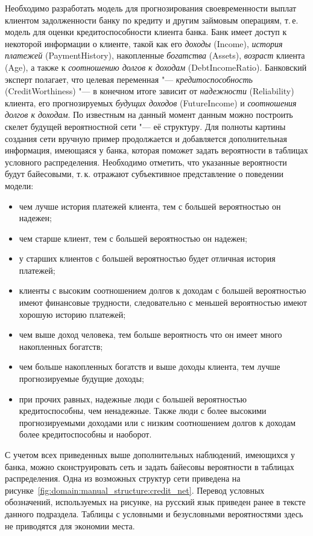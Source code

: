 Необходимо разработать модель для  прогнозирования своевременности выплат клиентом задолженности банку по кредиту и другим займовым операциям, т.\,е. модель для оценки кредитоспособности клиента банка.
Банк имеет доступ к некоторой информации о клиенте, такой как его \emph{доходы} (Income), \emph{история платежей} (PaymentHistory), накопленные \emph{богатства} (Assets), \emph{возраст} клиента (Age), а также к \emph{соотношению долгов к доходам} (DebtIncomeRatio).
Банковский эксперт полагает, что целевая переменная "--- \emph{кредитоспособность} (CreditWorthiness) "--- в конечном итоге зависит от \emph{надежности} (Reliability) клиента, его прогнозируемых \emph{будущих доходов} (FutureIncome) и \emph{соотношения долгов к доходам}.
По известным на данный момент данным можно построить скелет будущей вероятностной сети "--- её структуру.
Для полноты картины создания сети вручную пример продолжается и добавляется дополнительная информация, имеющаяся у банка, которая поможет задать вероятности в таблицах условного распределения.
Необходимо отметить, что указанные вероятности будут байесовыми, т.\,к. отражают субъективное представление о поведении модели:
\begin{itemize}
  \item чем лучше история платежей клиента, тем с большей вероятностью он надежен;
  \item чем старше клиент, тем с большей вероятностью он надежен;
  \item у старших клиентов с большей вероятностью будет отличная история платежей;
  \item клиенты с высоким соотношением долгов к доходам с большей вероятностью имеют финансовые трудности, следовательно с меньшей вероятностью имеют хорошую историю платежей;
  \item чем выше доход человека, тем больше вероятность что он имеет много накопленных богатств;
  \item чем больше накопленных богатств и выше доходы клиента, тем лучше прогнозируемые будущие доходы;
  \item при прочих равных, надежные люди с большей вероятностью кредитоспособны, чем ненадежные. Также люди с более высокими прогнозируемыми доходами или с низким соотношением долгов к доходам более кредитоспособны и наоборот. 
\end{itemize}

С учетом всех приведенных выше дополнительных наблюдений, имеющихся у банка, можно сконструировать сеть и задать байесовы вероятности в таблицах распределения.
Одна из возможных структур сети приведена на рисунке~\ref{fig:domain:manual_structure:credit_net}.
Перевод условных обозначений, используемых на рисунке, на русский язык приведен ранее в тексте данного подраздела.
Таблицы с условными и безусловными вероятностями здесь не приводятся для экономии места.


